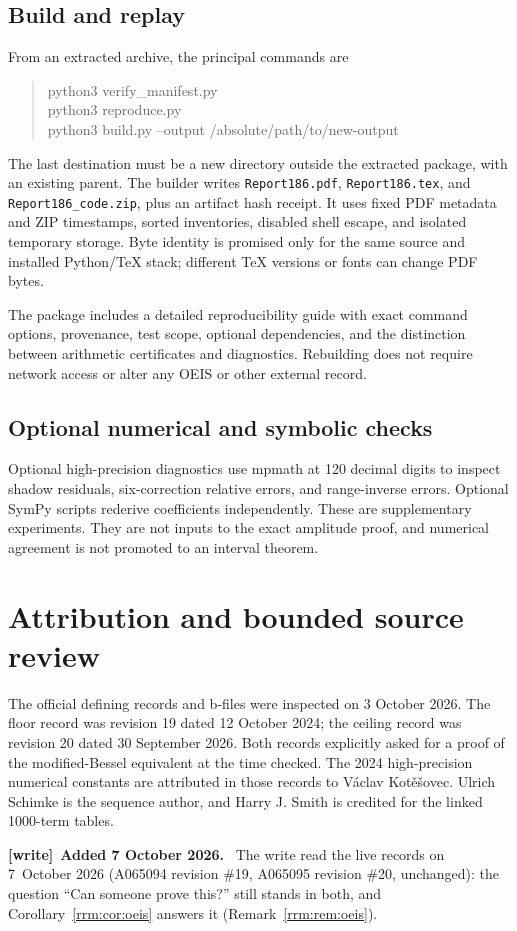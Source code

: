 \documentclass[11pt]{article}
\theoremstyle{remark}\newtheorem{remark}[theorem]{Remark}
\newenvironment{writenote}[1][]{\par\smallskip\begingroup\small
 \noindent\textbf{[write]}\if\relax\detokenize{#1}\relax\else~\textbf{#1.}\fi\ }%
 {\par\endgroup\smallskip}
\begin{document}
\subsection{Build and replay}
From an extracted archive, the principal commands are
\begin{quote}\ttfamily\small
python3 verify\_manifest.py\\
python3 reproduce.py\\
python3 build.py --output /absolute/path/to/new-output
\end{quote}
The last destination must be a new directory outside the extracted package, with an existing parent. The builder writes \texttt{Report186.pdf}, \texttt{Report186.tex}, and \texttt{Report186\_code.zip}, plus an artifact hash receipt. It uses fixed PDF metadata and ZIP timestamps, sorted inventories, disabled shell escape, and isolated temporary storage. Byte identity is promised only for the same source and installed Python/TeX stack; different TeX versions or fonts can change PDF bytes.

The package includes a detailed reproducibility guide with exact command options, provenance, test scope, optional dependencies, and the distinction between arithmetic certificates and diagnostics. Rebuilding does not require network access or alter any OEIS or other external record.

\subsection{Optional numerical and symbolic checks}
Optional high-precision diagnostics use mpmath at 120 decimal digits to inspect shadow residuals, six-correction relative errors, and range-inverse errors. Optional SymPy scripts rederive coefficients independently. These are supplementary experiments. They are not inputs to the exact amplitude proof, and numerical agreement is not promoted to an interval theorem.

\section{Attribution and bounded source review}\label{rrm:sec:sources}
The official defining records and b-files were inspected on 3 October 2026. The floor record was revision 19 dated 12 October 2024; the ceiling record was revision 20 dated 30 September 2026. Both records explicitly asked for a proof of the modified-Bessel equivalent at the time checked. The 2024 high-precision numerical constants are attributed in those records to V\'aclav Kot\v e\v sovec. Ulrich Schimke is the sequence author, and Harry J. Smith is credited for the linked 1000-term tables.
\begin{writenote}[Added 7 October 2026]
The write read the live records on 7~October 2026 (A065094 revision \#19,
A065095 revision \#20, unchanged): the question ``Can someone prove this?''
still stands in both, and Corollary~\ref{rrm:cor:oeis} answers it
(Remark~\ref{rrm:rem:oeis}).
\end{writenote}
\end{document}
